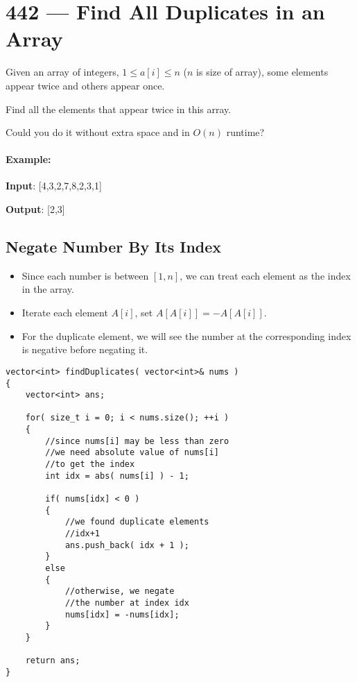 \section{442 --- Find All Duplicates in an Array}
Given an array of integers, $1 \leq a[i] \leq n$ ($n$ is size of array), some elements appear twice and others appear once.

Find all the elements that appear twice in this array.

Could you do it without extra space and in $O(n)$ runtime?

\paragraph{Example:}
\begin{flushleft}
\textbf{Input}: [4,3,2,7,8,2,3,1]

\textbf{Output}: [2,3]
\end{flushleft}

\subsection{Negate Number By Its Index}
\begin{itemize}
\item Since each number is between $ [1,n] $, we can treat each element as the index in the array.
\item Iterate each element $A[i]$, set $A[A[i]] = -A[A[i]]$.
\item For the duplicate element, we will see the number at the corresponding index is negative before negating it. 
\end{itemize}

\setcounter{lstlisting}{0}
\begin{lstlisting}[style=customc, caption={Negation Index}]
vector<int> findDuplicates( vector<int>& nums )
{
    vector<int> ans;

    for( size_t i = 0; i < nums.size(); ++i )
    {
        //since nums[i] may be less than zero
        //we need absolute value of nums[i]
        //to get the index
        int idx = abs( nums[i] ) - 1;

        if( nums[idx] < 0 )
        {
            //we found duplicate elements
            //idx+1
            ans.push_back( idx + 1 );
        }
        else
        {
            //otherwise, we negate
            //the number at index idx
            nums[idx] = -nums[idx];
        }
    }

    return ans;
}
\end{lstlisting}